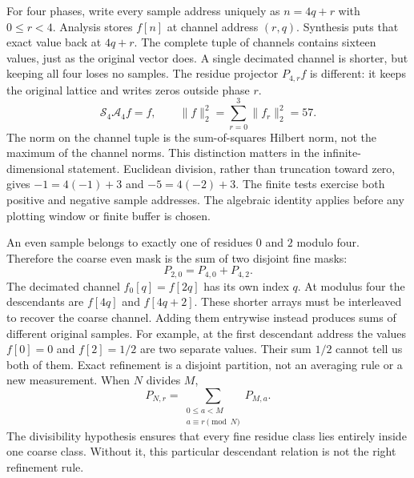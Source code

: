For four phases, write every sample address uniquely as $n=4q+r$ with $0\le r<4$. Analysis stores $f[n]$ at channel address $(r,q)$. Synthesis puts that exact value back at $4q+r$.
The complete tuple of channels contains sixteen values, just as the original vector does. A single decimated channel is shorter, but keeping all four loses no samples. The residue projector $P_{4,r}f$ is different: it keeps the original lattice and writes zeros outside phase $r$.
\[
\mathcal S_4\mathcal A_4f=f,
\qquad
\|f\|_2^2=\sum_{r=0}^3\|f_r\|_2^2=57.
\]
The norm on the channel tuple is the sum-of-squares Hilbert norm, not the maximum of the channel norms. This distinction matters in the infinite-dimensional statement.
Euclidean division, rather than truncation toward zero, gives
$-1=4(-1)+3$ and $-5=4(-2)+3$. The finite tests exercise both positive and negative sample addresses. The algebraic identity applies before any plotting window or finite buffer is chosen.

An even sample belongs to exactly one of residues $0$ and $2$ modulo four. Therefore the coarse even mask is the sum of two disjoint fine masks:
\[
P_{2,0}=P_{4,0}+P_{4,2}.
\]
The decimated channel $f_0[q]=f[2q]$ has its own index $q$. At modulus four the descendants are $f[4q]$ and $f[4q+2]$. These shorter arrays must be interleaved to recover the coarse channel. Adding them entrywise instead produces sums of different original samples.
For example, at the first descendant address the values $f[0]=0$ and $f[2]=1/2$ are two separate values. Their sum $1/2$ cannot tell us both of them. Exact refinement is a disjoint partition, not an averaging rule or a new measurement.
When $N$ divides $M$,
\[
P_{N,r}=\sum_{\substack{0\le a<M\\a\equiv r\pmod N}}P_{M,a}.
\]
The divisibility hypothesis ensures that every fine residue class lies entirely inside one coarse class. Without it, this particular descendant relation is not the right refinement rule.

